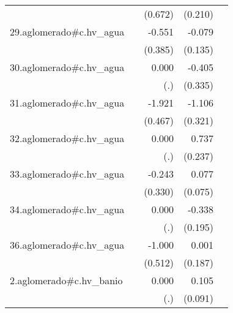 {\begin{longtable}{l*{4}{D{.}{.}{-1}}}
            &                     &     (0.672)         &     (0.210)         &                     \\
\addlinespace
29.aglomerado#c.hv\_agua&                     &      -0.551         &      -0.079         &                     \\
            &                     &     (0.385)         &     (0.135)         &                     \\
\addlinespace
30.aglomerado#c.hv\_agua&                     &       0.000         &      -0.405         &                     \\
            &                     &         (.)         &     (0.335)         &                     \\
\addlinespace
31.aglomerado#c.hv\_agua&                     &      -1.921\sym{***}&      -1.106\sym{***}&                     \\
            &                     &     (0.467)         &     (0.321)         &                     \\
\addlinespace
32.aglomerado#c.hv\_agua&                     &       0.000         &       0.737\sym{**} &                     \\
            &                     &         (.)         &     (0.237)         &                     \\
\addlinespace
33.aglomerado#c.hv\_agua&                     &      -0.243         &       0.077         &                     \\
            &                     &     (0.330)         &     (0.075)         &                     \\
\addlinespace
34.aglomerado#c.hv\_agua&                     &       0.000         &      -0.338         &                     \\
            &                     &         (.)         &     (0.195)         &                     \\
\addlinespace
36.aglomerado#c.hv\_agua&                     &      -1.000         &       0.001         &                     \\
            &                     &     (0.512)         &     (0.187)         &                     \\
\addlinespace
2.aglomerado#c.hv\_banio&                     &       0.000         &       0.105         &                     \\
            &                     &         (.)         &     (0.091)         &                     \\

\end{longtable}}
